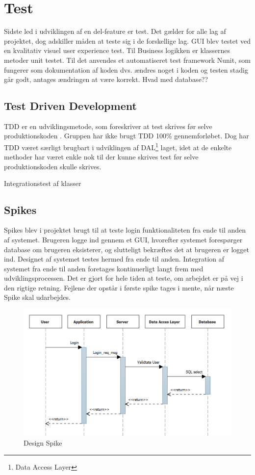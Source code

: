 \section{Test}
Sidste led i udviklingen af en del-feature er test. Det gælder for alle lag af projektet, dog adskiller måden at teste sig i de forskellige lag. GUI blev testet ved en kvalitativ visuel user experience test. Til Business logikken er klassernes metoder unit testet. Til det anvendes et automatiseret test framework Nunit, som fungerer som dokumentation af koden dvs. ændres noget i koden og testen stadig går godt, antages ændringen at være korrekt. Hvad med database??

\subsection{Test Driven Development}
TDD er en udviklingsmetode, som foreskriver at test skrives før selve produktionskoden \cite{osherove2015art}. Gruppen har ikke brugt TDD 100\% gennemforløbet. 
Dog har TDD været særligt brugbart i udviklingen af DAL\footnote{Data Access Layer} laget, idet at de enkelte methoder har været enkle nok til der kunne skrives test før selve produktionskoden skulle skrives.

Integrationstest af klasser

\subsection{Spikes} %
Spikes blev i projektet brugt til at teste login funktionaliteten fra ende til anden af systemet. Brugeren logge ind gennem et GUI, hvorefter systemet forespørger database om brugeren eksisterer, og slutteligt bekræftes det at brugeren er logget ind. Designet af systemet testes hermed fra ende til anden. Integration af systemet fra ende til anden foretages kontinuerligt langt frem med udviklingsprocessen. Det er gjort for hele tiden at teste, om arbejdet er på vej i den rigtige retning. Fejlene der opstår i første spike tages i mente, når næste Spike skal udarbejdes. 

\begin{figure}
	\centering
	\includegraphics[width=0.6\linewidth]{figs/processProjektGennemforsel/Spike.PNG}
	\caption{Design Spike}
	\label{fig:design_spike}
\end{figure}


